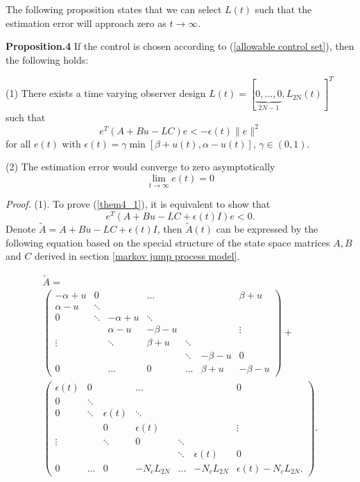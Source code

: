 \documentclass[journal]{IEEEtran}
\begin{document}
The following proposition states that we can select $L(t)$ such that the estimation error will approach zero as $t\rightarrow\infty$.

\textbf{Proposition.4} If the control is chosen according to (\ref{allowable control set}), then the following holds:

(1) There exists a time varying observer design $L(t)=[\underbrace{0,\ldots,0}_{2N-1},L_{\textrm{2N}}(t)]^{T}$ such that 
\begin{equation}
\label{them4_1}
e^{T}(A+Bu-LC)e < -\epsilon(t) \|e\|^{2}
\end{equation}
for all $e(t)$ with $\epsilon(t)=\gamma\min [\beta+u(t),\alpha-u(t)]$, $\gamma\in (0,1)$. 

(2) The estimation error would converge to zero asymptotically 
\begin{equation}
\lim\limits_{t\rightarrow\infty}e(t)=0
\end{equation}


\textit{Proof.} (1). To prove (\ref{them4_1}), it is equivalent to show that
\begin{equation}
e^{T}(A+Bu-LC+\epsilon(t)I)e < 0.
\end{equation}
Denote $\tilde{A}=A+Bu-LC+\epsilon(t)I$, then $\tilde{A}(t)$ can be expressed by the following equation based on the special structure of the state space matrices $A,B$ and $C$ derived in section \ref{markov jump process model}.

{\scriptsize
\begin{equation}
\label{tiledeA}
\begin{array}{ll}
\tilde{A}=\\
\left( \begin{array} {ccccccc}
-\alpha+u & 0 & &\ldots &  & & \beta+u \\
\alpha-u & \ddots & & & & & \\
0 & \ddots & -\alpha+u &\ddots &  & & \\
& & \alpha-u & -\beta-u &  & &\vdots \\
\vdots& & \ddots& \beta+u & \ddots & & \\
& & & &\ddots & -\beta-u & 0 \\
0 & & \ldots & 0  & \ldots& \beta+u &-\beta-u
\end{array} \right)+\\
\left( \begin{array} {ccccccc}
\epsilon(t) & 0 & &\ldots &  & & 0 \\
0 & \ddots & & & & & \\
0 & \ddots & \epsilon(t) &\ddots &  & & \\
& & 0 & \epsilon(t) &  & &\vdots \\
\vdots& & \ddots& 0 & \ddots & & \\
& & & &\ddots & \epsilon(t) & 0 \\
0 & \ldots & 0 & -N_{c}L_{2N}  & \ldots& -N_{c}L_{2N} &\epsilon(t)-N_{c}L_{2N}.
\end{array} \right).
\end{array}
\end{equation}
}
\end{document}
